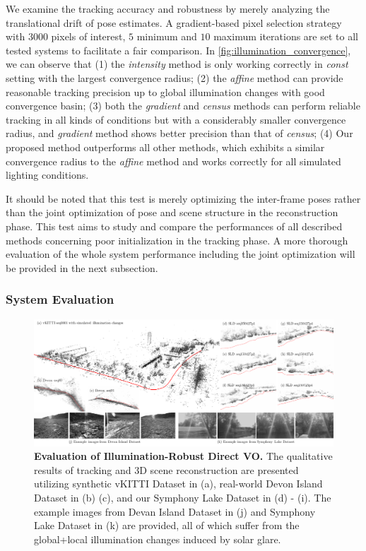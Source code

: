 We examine the tracking accuracy and robustness by merely analyzing the translational drift of pose estimates. 
A gradient-based pixel selection strategy with $3000$ pixels of interest, $5$ minimum and $10$ maximum iterations are set to all tested systems to facilitate a fair comparison. 
In \ref{fig:illumination_convergence}, we can observe that 
(1) the {\em intensity} method is only working correctly in {\em const} setting with the largest convergence radius; 
(2) the {\em affine} method can provide reasonable tracking precision up to global illumination changes with good convergence basin; 
(3) both the {\em gradient} and {\em census} methods can perform reliable tracking in all kinds of conditions but with a considerably smaller convergence radius, and {\em gradient} method shows better precision than that of {\em census}; 
(4) Our proposed method outperforms all other methods, which exhibits a similar convergence radius to the {\em affine} method and works correctly for all simulated lighting conditions. 

It should be noted that this test is merely optimizing the inter-frame poses rather than the joint optimization of pose and scene structure in the reconstruction phase. 
This test aims to study and compare the performances of all described methods concerning poor initialization in the tracking phase. 
A more thorough evaluation of the whole system performance including the joint optimization will be provided in the next subsection.   

\subsubsection{System Evaluation}

\begin{figure} 
  	\centering
  	\includegraphics[width=\linewidth]{figures/illumination/direct_trajectory.pdf}
	\caption[Evaluation of Illumination-Robust Direct VO]{ \textbf{Evaluation of Illumination-Robust Direct VO.} The qualitative results of tracking and 3D scene reconstruction are presented utilizing synthetic vKITTI Dataset in (a), real-world Devon Island Dataset in (b) (c), and our Symphony Lake Dataset in (d) - (i). The example images from Devan Island Dataset in (j) and Symphony Lake Dataset in (k)  are provided, all of which suffer from the global+local illumination changes induced by solar glare. 
	\label{fig:illumination_directvo}}
\end{figure}

